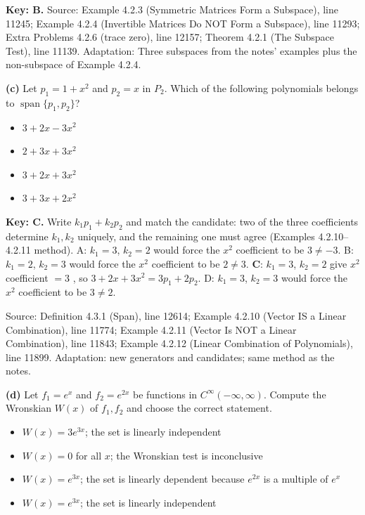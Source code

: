 \documentclass[11pt,a4paper]{article}
\newcommand{\Src}[1]{{\footnotesize\color{black!65}Source: #1}}
\begin{document}
\textbf{Key: B.} \Src{Example 4.2.3 (Symmetric Matrices Form a Subspace), line 11245; Example 4.2.4 (Invertible Matrices Do NOT Form a Subspace), line 11293; Extra Problems 4.2.6 (trace zero), line 12157; Theorem 4.2.1 (The Subspace Test), line 11139. Adaptation: Three subspaces from the notes' examples plus the non-subspace of Example 4.2.4.}\par
\textbf{(c)} Let $p_1=1+x^{2}$ and $p_2=x$ in $P_2$. Which of the following polynomials belongs to $\operatorname{span}\{p_1,p_2\}$?\par
\begin{itemize}[leftmargin=8mm,itemsep=0pt]\item[A] $3+2x-3x^{2}$\item[B] $2+3x+3x^{2}$\item[C$^{\ast}$] $3+2x+3x^{2}$\item[D] $3+3x+2x^{2}$\end{itemize}
\textbf{Key: C.} Write $k_1p_1+k_2p_2$ and match the candidate: two of the three coefficients determine $k_1,k_2$ uniquely, and the remaining one must agree (Examples 4.2.10--4.2.11 method). A: $k_1=3$, $k_2=2$ would force the $x^{2}$ coefficient to be $3\neq-3$. B: $k_1=2$, $k_2=3$ would force the $x^{2}$ coefficient to be $2\neq3$. \textbf{C}: $k_1=3$, $k_2=2$ give $x^{2}$ coefficient $=3$ \checkmark, so $3+2x+3x^{2}=3p_1+2p_2$. D: $k_1=3$, $k_2=3$ would force the $x^{2}$ coefficient to be $3\neq2$.\par
\Src{Definition 4.3.1 (Span), line 12614; Example 4.2.10 (Vector IS a Linear Combination), line 11774; Example 4.2.11 (Vector Is NOT a Linear Combination), line 11843; Example 4.2.12 (Linear Combination of Polynomials), line 11899. Adaptation: new generators and candidates; same method as the notes.}\par
\textbf{(d)} Let $f_1=e^{x}$ and $f_2=e^{2x}$ be functions in $C^{\infty}(-\infty,\infty)$. Compute the Wronskian $W(x)$ of $f_1,f_2$ and choose the correct statement.\par
\begin{itemize}[leftmargin=8mm,itemsep=0pt]\item[A] $W(x)=3e^{3x}$; the set is linearly independent\item[B] $W(x)=0$ for all $x$; the Wronskian test is inconclusive\item[C] $W(x)=e^{3x}$; the set is linearly dependent because $e^{2x}$ is a multiple of $e^{x}$\item[D$^{\ast}$] $W(x)=e^{3x}$; the set is linearly independent\end{itemize}
\end{document}
